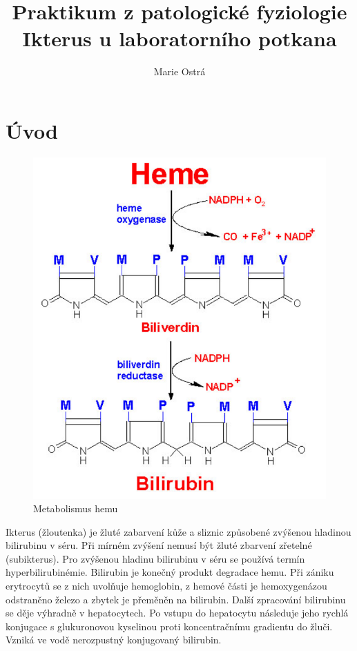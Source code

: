 \documentclass[12pt]{article}
\begin{document}
\title{Praktikum z patologické fyziologie \\
Ikterus u laboratorního potkana}
\author{Marie Ostrá}
\maketitle

\section{Úvod}

\begin{figure}
  \vspace{-20pt}
  \begin{center}
	\includegraphics[width=\linewidth]{metabolismus-bilirubinu.png}
	\caption{Metabolismus hemu}
  \end{center}
  \vspace{-20pt}
\end{figure}

Ikterus (žloutenka) je žluté zabarvení kůže a sliznic způsobené zvýšenou hladinou bilirubinu v séru. Při mírném zvýšení nemusí být žluté zbarvení zřetelné (subikterus). Pro zvýšenou hladinu bilirubinu v séru se používá termín hyperbilirubinémie. Bilirubin je konečný produkt degradace hemu. Při zániku erytrocytů se z nich uvolňuje hemoglobin, z hemové části je hemoxygenázou odstraněno železo a zbytek je přeměněn na bilirubin. Další zpracování bilirubinu se děje výhradně v hepatocytech. Po vstupu do hepatocytu následuje jeho rychlá konjugace s glukuronovou kyselinou proti koncentračnímu gradientu do žluči. Vzniká ve vodě nerozpustný konjugovaný bilirubin.
\end{document}
